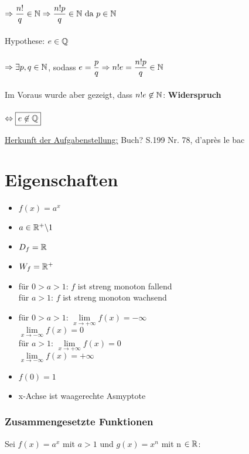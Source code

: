 \documentclass[main.tex]{subfiles}
\begin{document}
\begin{Beweis}
\begin{enumerate}
$\Rightarrow \dfrac{n!}{q}\in\mathbb{N}\Rightarrow\dfrac{n!p}{q}\in\mathbb{N}\text{ da }p\in\mathbb{N}$\\\\
Hypothese: $e\in\mathbb{Q}$\\\\
$\Rightarrow \exists p,q \in\mathbb{N}$, sodass $e=\dfrac{p}{q}\\
\Rightarrow n!e=\dfrac{n!p}{q}\in\mathbb{N}$\\\\
Im Voraus wurde aber gezeigt, dass $n!e\not\in\mathbb{N}$: \textbf{Widerspruch}\\\\
$\Leftrightarrow \boxed{e\not\in\mathbb{Q}}$\\
\end{enumerate}
\underline{Herkunft der Aufgabenstellung:} Buch? S.199 Nr. 78, d'après le bac
\end{Beweis}
\newpage
\section{Eigenschaften}

\begin{itemize}
\item$f(x)=a^x$
\item$a\in\mathbb{R}^+\backslash 1$
\item$D_f=\mathbb{R}$
\item$W_f=\mathbb{R}^+$
\item für $0>a>1$: $f$ ist streng monoton fallend\\
für $a>1$: $f$ ist streng monoton wachsend
\item für $0>a>1$: $\lim\limits_{x\to +\infty}f(x)=-\infty$\\
			$\lim\limits_{x\to -\infty}f(x)=0$\\
für $a>1$: $\lim\limits_{x\to +\infty}f(x)=0$\\
	        $\lim\limits_{x\to -\infty}f(x)=+\infty$
\item $f(0)=1$
\item x-Achse ist waagerechte Asmyptote

\end{itemize}

\subsubsection{Zusammengesetzte Funktionen}

Sei $f(x)= a^x$ mit $a>1$ und $g(x)=x^n$ mit n $\in \mathbb{R}$:\\
\end{document}
